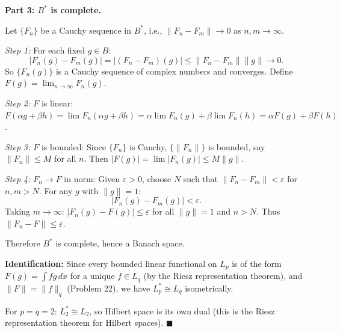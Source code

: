 \documentclass[12pt]{article}
\begin{document}
\textbf{Part 3: $B^*$ is complete.}

Let $\{F_n\}$ be a Cauchy sequence in $B^*$, i.e., $\|F_n-F_m\|\to 0$ as $n,m\to\infty$.

\emph{Step 1:} For each fixed $g\in B$:
\[
|F_n(g)-F_m(g)| = |(F_n-F_m)(g)| \le \|F_n-F_m\|\|g\| \to 0.
\]
So $\{F_n(g)\}$ is a Cauchy sequence of complex numbers and converges. Define $F(g) = \lim_{n\to\infty}F_n(g)$.

\emph{Step 2:} $F$ is linear: $F(\alpha g+\beta h) = \lim F_n(\alpha g+\beta h) = \alpha\lim F_n(g)+\beta\lim F_n(h) = \alpha F(g)+\beta F(h)$.

\emph{Step 3:} $F$ is bounded: Since $\{F_n\}$ is Cauchy, $\{\|F_n\|\}$ is bounded, say $\|F_n\|\le M$ for all $n$. Then $|F(g)| = \lim|F_n(g)|\le M\|g\|$.

\emph{Step 4:} $F_n\to F$ in norm: Given $\varepsilon>0$, choose $N$ such that $\|F_n-F_m\|<\varepsilon$ for $n,m>N$. For any $g$ with $\|g\|=1$:
\[
|F_n(g)-F_m(g)| < \varepsilon.
\]
Taking $m\to\infty$: $|F_n(g)-F(g)|\le\varepsilon$ for all $\|g\|=1$ and $n>N$. Thus $\|F_n-F\|\le\varepsilon$.

Therefore $B^*$ is complete, hence a Banach space.

\textbf{Identification:} Since every bounded linear functional on $L_p$ is of the form $F(g)=\int fg\,dx$ for a unique $f\in L_q$ (by the Riesz representation theorem), and $\|F\|=\|f\|_q$ (Problem 22), we have $L_p^* \cong L_q$ isometrically.

For $p=q=2$: $L_2^* \cong L_2$, so Hilbert space is its own dual (this is the Riesz representation theorem for Hilbert spaces). $\blacksquare$
\end{document}
